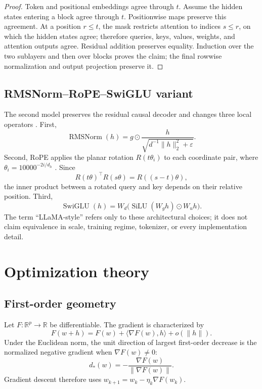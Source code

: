 \documentclass[11pt]{article}
\newcommand{\R}{\mathbb R}
\newcommand{\1}{\mathbf 1}
\begin{document}
\begin{proof}
Token and positional embeddings agree through $t$. Assume the hidden states
entering a block agree through $t$. Positionwise maps preserve this agreement.
At a position $r\le t$, the mask restricts attention to indices $s\le r$, on
which the hidden states agree; therefore queries, keys, values, weights, and
attention outputs agree. Residual addition preserves equality. Induction over
the two sublayers and then over blocks proves the claim; the final rowwise
normalization and output projection preserve it.
\end{proof}

\subsection{RMSNorm--RoPE--SwiGLU variant}

The second model preserves the residual causal decoder and changes three local
operators \cite{touvron-2023-llama}. First,
\[
 \operatorname{RMSNorm}(h)=g\odot
 \frac{h}{\sqrt{d^{-1}\|h\|_2^2+\varepsilon}}.
\]
Second, RoPE applies the planar rotation $R(t\theta_i)$ to each coordinate pair,
where $\theta_i=10000^{-2i/d_h}$ \cite{su-2021-roformer}. Since
\[
 R(t\theta)^{\top}R(s\theta)=R((s-t)\theta),
\]
the inner product between a rotated query and key depends on their relative
position. Third,
\[
 \operatorname{SwiGLU}(h)=W_d
 \bigl(\operatorname{SiLU}(W_gh)\odot W_uh\bigr).
\]
The term ``LLaMA-style'' refers only to these architectural choices; it does not
claim equivalence in scale, training regime, tokenizer, or every implementation
detail.

\section{Optimization theory}
\label{sec:optimization}

\subsection{First-order geometry}

Let $F:\R^p\to\R$ be differentiable. The gradient is characterized by
\[
 F(w+h)=F(w)+\langle\nabla F(w),h\rangle+o(\|h\|).
\]
Under the Euclidean norm, the unit direction of largest first-order decrease is
the normalized negative gradient when $\nabla F(w)\ne0$:
\[
 d_*(w)=-\frac{\nabla F(w)}{\|\nabla F(w)\|}.
\]
Gradient descent therefore uses $w_{k+1}=w_k-\eta_k\nabla F(w_k)$.
\end{document}
